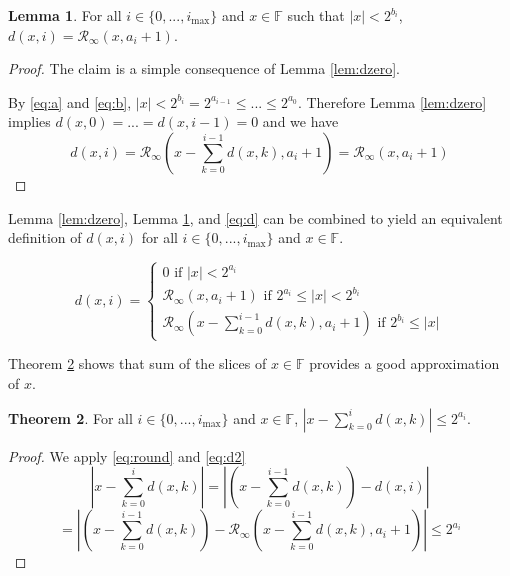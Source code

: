 \documentclass[12pt]{article}
\providecommand{\F}{\ensuremath{\mathbb{F}}}
\providecommand{\max}{\ensuremath{\text{max}}}
\providecommand{\roundtonearestinfty}{\ensuremath{\mathcal{R}_\text{$\infty$}}}
\theoremstyle{definition}
\newtheorem{thm}{Theorem}[section]
\newtheorem{lem}[thm]{Lemma}
\numberwithin{equation}{section}
\numberwithin{figure}{section}
\begin{document}
    \begin{samepage}
    \begin{lem}
      For all $i \in \{0, ..., i_{\max}\}$ and $x \in \F$ such that $|x| < 2^{b_i}$, $d(x, i) = \roundtonearestinfty(x, a_i + 1)$.
      \label{lem:dmiddle}
    \end{lem}
    \end{samepage}

    \begin{proof}
      The claim is a simple consequence of Lemma \ref{lem:dzero}.

      By  \eqref{eq:a} and \eqref{eq:b}, $|x| < 2^{b_i} = 2^{a_{i - 1}} \leq  ... \leq 2^{a_0}$. Therefore Lemma \ref{lem:dzero} implies $d(x, 0) = ... = d(x, i - 1) = 0$ and we have \begin{equation*}
        d(x, i) = \roundtonearestinfty(x - \sum\limits_{k = 0}^{i - 1}d(x, k), a_{i} + 1) = \roundtonearestinfty(x, a_{i} + 1)
      \end{equation*}
    \end{proof}

    Lemma \ref{lem:dzero}, Lemma \ref{lem:dmiddle}, and \eqref{eq:d} can be combined to yield an equivalent definition of $d(x, i)$ for all $i \in \{0, ..., i_{\max}\}$ and $x \in \F$.

    \begin{equation}
      d(x, i) = \begin{cases}0 \text{ if } |x| < 2^{a_i}\\ \roundtonearestinfty(x, a_i + 1) \text{ if } 2^{a_i} \leq |x| < 2^{b_i}\\\roundtonearestinfty(x - \sum\limits_{k=0}^{i - 1}d(x,k), a_i + 1) \text{ if } 2^{b_i} \leq |x| \end{cases}
      \label{eq:d2}
    \end{equation}

    Theorem \ref{thm:dround} shows that sum of the slices of $x \in \F$ provides a good approximation of $x$.

    \begin{samepage}
    \begin{thm}
      For all $i \in \{0, ..., i_{\max}\}$ and $x \in \F$, $|x - \sum \limits_{k = 0}^id(x, k)| \leq 2^{a_i}$.
      \label{thm:dround}
    \end{thm}
    \end{samepage}

    \begin{proof}
      We apply  \eqref{eq:round} and \eqref{eq:d2}
      \begin{equation*}
        |x - \sum \limits_{k = 0}^{i}d(x, k)| = |(x - \sum \limits_{k = 0}^{i - 1}d(x, k)) - d(x, i)|
      \end{equation*}
      \begin{equation*}
         = |(x - \sum \limits_{k = 0}^{i - 1}d(x, k)) - \roundtonearestinfty(x - \sum \limits_{k = 0}^{i - 1}d(x, k), a_{i} + 1)| \leq 2^{a_{i}}
      \end{equation*}
    \end{proof}
\end{document}
